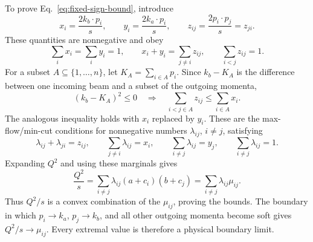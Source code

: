 To prove Eq.~\eqref{eq:fixed-sign-bound}, introduce
\begin{equation}
 x_i=\frac{2k_b\cdot p_i}{s},
 \qquad
 y_i=\frac{2k_a\cdot p_i}{s},
 \qquad
 z_{ij}=\frac{2p_i\cdot p_j}{s}=z_{ji}.
 \label{eq:sign-edge-data}
\end{equation}
These quantities are nonnegative and obey
\begin{equation}
 \sum_i x_i=\sum_i y_i=1,
 \qquad
 x_i+y_i=\sum_{j\ne i}z_{ij},
 \qquad
 \sum_{i<j}z_{ij}=1.
 \label{eq:sign-edge-relations}
\end{equation}
For a subset $A\subseteq\{1,\ldots,n\}$, let
$K_A=\sum_{i\in A}p_i$.  Since $k_b-K_A$ is the difference between one
incoming beam and a subset of the outgoing momenta,
\begin{equation}
 (k_b-K_A)^2\leq0
 \quad\Longrightarrow\quad
 \sum_{i<j\in A}z_{ij}\leq\sum_{i\in A}x_i.
 \label{eq:subset-inequality}
\end{equation}
The analogous inequality holds with $x_i$ replaced by $y_i$.  These are
the max-flow/min-cut conditions for nonnegative numbers
$\lambda_{ij}$, $i\ne j$, satisfying
\begin{equation}
 \lambda_{ij}+\lambda_{ji}=z_{ij},
 \qquad
 \sum_{j\ne i}\lambda_{ij}=x_i,
 \qquad
 \sum_{i\ne j}\lambda_{ij}=y_j,
 \qquad
 \sum_{i\ne j}\lambda_{ij}=1.
 \label{eq:edge-orientation}
\end{equation}
Expanding $Q^2$ and using these marginals gives
\begin{equation}
 \frac{Q^2}{s}
 =\sum_{i\ne j}\lambda_{ij}(a+c_i)(b+c_j)
 =\sum_{i\ne j}\lambda_{ij}\mu_{ij}.
 \label{eq:sign-convex-combination}
\end{equation}
Thus $Q^2/s$ is a convex combination of the $\mu_{ij}$, proving the
bounds.  The boundary in which $p_i\to k_a$, $p_j\to k_b$, and all other
outgoing momenta become soft gives $Q^2/s\to\mu_{ij}$.  Every extremal value
is therefore a physical boundary limit.
